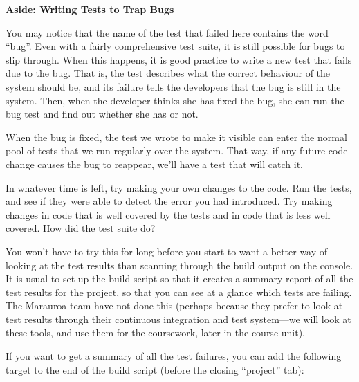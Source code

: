 \documentclass[
]{book}
\begin{document}
\textbf{Aside: Writing Tests to Trap Bugs}

You may notice that the name of the test that failed here contains the word ``bug''. Even with a fairly comprehensive test suite, it is still possible for bugs to slip through. When this happens, it is good practice to write a new test that fails due to the bug. That is, the test describes what the correct behaviour of the system should be, and its failure tells the developers that the bug is still in the system. Then, when the developer thinks she has fixed the bug, she can run the bug test and find out whether she has or not.

When the bug is fixed, the test we wrote to make it visible can enter the normal pool of tests that we run regularly over the system. That way, if any future code change causes the bug to reappear, we'll have a test that will catch it.

In whatever time is left, try making your own changes to the code. Run the tests, and see if they were able to detect the error you had introduced. Try making changes in code that is well covered by the tests and in code that is less well covered. How did the test suite do?

You won't have to try this for long before you start to want a better way of looking at the test results than scanning through the build output on the console. It is usual to set up the build script so that it creates a summary report of all the test results for the project, so that you can see at a glance which tests are failing. The Marauroa team have not done this (perhaps because they prefer to look at test results through their continuous integration and test system---we will look at these tools, and use them for the coursework, later in the course unit).

If you want to get a summary of all the test failures, you can add the following target to the end of the build script (before the closing ``project'' tab):
\end{document}
